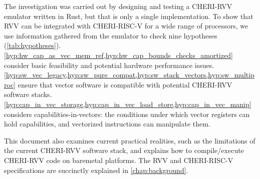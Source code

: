 \documentclass[../thesis]{subfiles}
\begin{document}
The investigation was carried out by designing and testing a CHERI-RVV emulator written in Rust, but that is only a single implementation.
To show that RVV can be integrated with CHERI-RISC-V for a wide range of processors, we use information gathered from the emulator to check nine hypotheses (\cref{tab:hypotheses}).
\cref{hyp:hw_cap_as_vec_mem_ref,hyp:hw_cap_bounds_checks_amortized} consider basic feasibility and potential hardware performance issues.
\cref{hyp:sw_vec_legacy,hyp:sw_pure_compat,hyp:sw_stack_vectors,hyp:sw_multiproc} ensure that vector software is compatible with potential CHERI-RVV software stacks.
\cref{hyp:cap_in_vec_storage,hyp:cap_in_vec_load_store,hyp:cap_in_vec_manip} considers capabilities-in-vectors: the conditions under which vector registers can hold capabilities, and vectorized instructions can manipulate them.

This document also examines current practical realities, such as the limitations of the current CHERI-RVV software stack, and explains how to compile/execute CHERI-RVV code on baremetal platforms.
The RVV and CHERI-RISC-V specifications are succinctly explained in \cref{chap:background}.


\vfill\null
\end{document}
